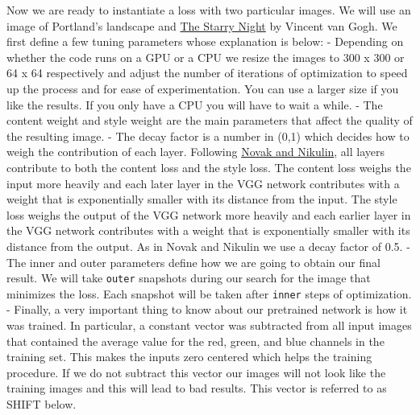 \documentclass[]{book}
\theoremstyle{definition}
\theoremstyle{definition}
\theoremstyle{definition}
\theoremstyle{remark}
\begin{document}
Now we are ready to instantiate a loss with two particular images. We
will use an image of Portland's landscape and
\href{https://en.wikipedia.org/wiki/The_Starry_Night}{The Starry Night}
by Vincent van Gogh. We first define a few tuning parameters whose
explanation is below: - Depending on whether the code runs on a GPU or a
CPU we resize the images to 300 x 300 or 64 x 64 respectively and adjust
the number of iterations of optimization to speed up the process and for
ease of experimentation. You can use a larger size if you like the
results. If you only have a CPU you will have to wait a while. - The
content weight and style weight are the main parameters that affect the
quality of the resulting image. - The decay factor is a number in (0,1)
which decides how to weigh the contribution of each layer. Following
\href{https://arxiv.org/abs/1605.04603}{Novak and Nikulin}, all layers
contribute to both the content loss and the style loss. The content loss
weighs the input more heavily and each later layer in the VGG network
contributes with a weight that is exponentially smaller with its
distance from the input. The style loss weighs the output of the VGG
network more heavily and each earlier layer in the VGG network
contributes with a weight that is exponentially smaller with its
distance from the output. As in Novak and Nikulin we use a decay factor
of 0.5. - The inner and outer parameters define how we are going to
obtain our final result. We will take \texttt{outer} snapshots during
our search for the image that minimizes the loss. Each snapshot will be
taken after \texttt{inner} steps of optimization. - Finally, a very
important thing to know about our pretrained network is how it was
trained. In particular, a constant vector was subtracted from all input
images that contained the average value for the red, green, and blue
channels in the training set. This makes the inputs zero centered which
helps the training procedure. If we do not subtract this vector our
images will not look like the training images and this will lead to bad
results. This vector is referred to as SHIFT below.
\end{document}
